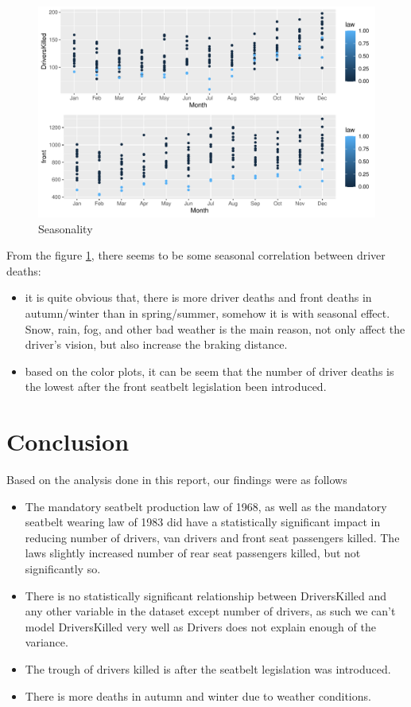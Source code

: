 \documentclass[11pt,a4paper,]{article}
\providecommand{\tightlist}{%
  \setlength{\itemsep}{0pt}\setlength{\parskip}{0pt}}
\begin{document}
\begin{figure}
\centering
\includegraphics{report_files/figure-latex/season-1.pdf}
\caption{\label{fig:season}Seasonality}
\end{figure}

From the figure \ref{fig:season}, there seems to be some seasonal correlation between driver deaths:

\begin{itemize}
\item
  it is quite obvious that, there is more driver deaths and front deaths in autumn/winter than in spring/summer, somehow it is with seasonal effect. Snow, rain, fog, and other bad weather is the main reason, not only affect the driver's vision, but also increase the braking distance.
\item
  based on the color plots, it can be seem that the number of driver deaths is the lowest after the front seatbelt legislation been introduced.
\end{itemize}

\hypertarget{conclusion}{%
\section{Conclusion}\label{conclusion}}

Based on the analysis done in this report, our findings were as follows

\begin{itemize}
\tightlist
\item
  The mandatory seatbelt production law of 1968, as well as the mandatory seatbelt wearing law of 1983 did have a statistically significant impact in reducing number of drivers, van drivers and front seat passengers killed. The laws slightly increased number of rear seat passengers killed, but not significantly so.
\item
  There is no statistically significant relationship between DriversKilled and any other variable in the dataset except number of drivers, as such we can't model DriversKilled very well as Drivers does not explain enough of the variance.
\item
  The trough of drivers killed is after the seatbelt legislation was introduced.
\item
  There is more deaths in autumn and winter due to weather conditions.
\end{itemize}
\end{document}
